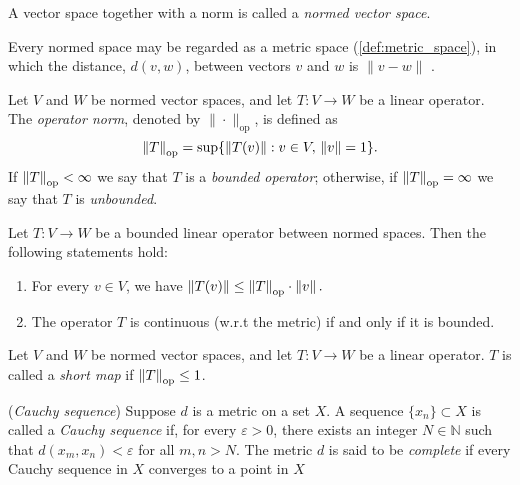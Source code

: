 \begin{definition} \label{def:normed_space}
A vector space together with a norm is called a \emph{normed vector space}.
\end{definition}


Every normed space may be regarded as a metric space (\autoref{def:metric_space}), in which the
distance, $d(v,w)$, between vectors $v$ and $w$ is $\|v-w\|$ .

\begin{definition} \label{def:op_norm}
Let \( V \) and \( W \) be normed vector spaces, and let \( T: V \rightarrow W \) be a linear operator. The \emph{operator norm}, denoted by $\|\cdot\|_{\text{op}}$, is defined as
\[
\left\lVert T \right\rVert_{\text{op}}= \sup \{ \left\lVert T(v) \right\rVert : v \in V, \, \left\lVert v \right\rVert = 1 \}.
\]
If \( \left\lVert T \right\rVert_{\text{op}} < \infty \) we say that \( T \) is a \emph{bounded operator}; otherwise, if \( \left\lVert T \right\rVert_{\text{op}} = \infty \) we say that \( T \) is \emph{unbounded}. 
\end{definition}

\begin{lemma} \cite[Lemma 6.4]{guide2006infinite} \label{lemma:op_norm_submult} %
Let \( T: V \rightarrow W \) be a bounded linear operator between normed spaces. Then the following statements hold:
\begin{enumerate}
  \item For every \( v \in V \), we have \( 
  \left\lVert T(v) \right\rVert \leq \left\lVert T \right\rVert_{\text{op}} \cdot \left\lVert v \right\rVert.\)
  \item The operator \( T \) is continuous (w.r.t the metric) if and only if it is bounded.
\end{enumerate}
\end{lemma}




\begin{definition}
  Let \( V \) and \( W \) be normed vector spaces, and let \( T: V \rightarrow W \) be a linear operator. $T$ is called a \emph{short map} if $\left\lVert T \right\rVert_{\text{op}} \leq 1$.
\end{definition}





\begin{definition} (\emph{Cauchy sequence})
  Suppose $ d $ is a metric on a set $ X $. A sequence $ \{x_n\} \subset X $ is called a \emph{Cauchy sequence} if, for every $ \varepsilon > 0 $, there exists an integer $N \in \mathbb{N} $ such that $ d(x_m, x_n) < \varepsilon $ for all $ m, n > N $.  The metric \( d \) is said to be \emph{complete} if every Cauchy sequence in \( X \) converges to a point in \( X \)
\end{definition}

